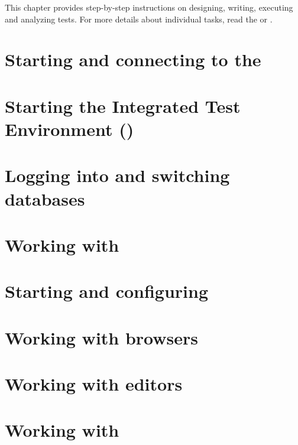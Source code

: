 %
This chapter provides step-by-step instructions on designing, writing, executing and analyzing tests. 
For more details about individual tasks, read the 
 or . 

\section{Starting and connecting to the \gdagent}


\section{Starting the Integrated Test Environment (\ite{})}


\section{Logging into and switching databases}



\clearpage

\section{Working with \gdprojects{}}
\label{WorkingWithProjects}


\clearpage
\section{Starting and configuring \gdauts{}}
\label{StartAUT}


\clearpage
\section{Working with browsers}
\label{WorkingWithBrowsers}


\section{Working with editors}
\label{WorkingWithEditors}


\clearpage
\section{Working with \gdcases{}}
\label{WorkingWithTestCases}


